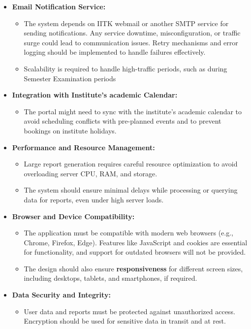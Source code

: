 \documentclass[a4paper,12pt]{article}
\begin{document}
\begin{itemize}
    \item \textbf{Email Notification Service:}
    \begin{itemize}
        \item The system depends on IITK webmail or another SMTP service for sending notifications. Any service downtime, misconfiguration, or traffic surge could lead to communication issues. Retry mechanisms and error logging should be implemented to handle failures effectively.
        \item Scalability is required to handle high-traffic periods, such as during Semester Examination periods
    \end{itemize}
    \item \textbf{Integration with Institute’s academic Calendar:}
    \begin{itemize}
        \item The portal might need to sync with the institute’s academic calendar to avoid scheduling conflicts with pre-planned events and to prevent bookings on institute holidays.
    \end{itemize}
    \item \textbf{Performance and Resource Management:}
    \begin{itemize}
        \item Large report generation requires careful resource optimization to avoid overloading server CPU, RAM, and storage.
        \item The system should ensure minimal delays while processing or querying data for reports, even under high server loads.
    \end{itemize}
    \item \textbf{Browser and Device Compatibility:}
    \begin{itemize}
        \item The application must be compatible with modern web browsers (e.g., Chrome, Firefox, Edge). Features like JavaScript and cookies are essential for functionality, and support for outdated browsers will not be provided.
        \item The design should also ensure \textbf{responsiveness} for different screen sizes, including desktops, tablets, and smartphones, if required.
    \end{itemize}
    \item \textbf{Data Security and Integrity:}
    \begin{itemize}
        \item User data and reports must be protected against unauthorized access. Encryption should be used for sensitive data in transit and at rest.

\end{itemize}
\end{itemize}
\end{document}
